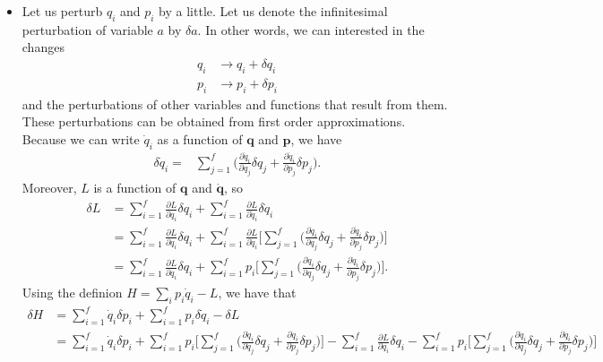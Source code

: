 \documentclass[10pt]{article}
\newcommand{\ve}[1]{\mathbf{#1}}
\begin{document}
\begin{itemize}
    \item Let us perturb $q_i$ and $p_i$ by a little. Let us denote the infinitesimal perturbation of variable $a$ by $\delta a$. In other words, we can interested in the changes
    \begin{align*}
      q_i &\rightarrow q_i + \delta q_i \\
      p_i &\rightarrow p_i + \delta p_i
    \end{align*}
    and the perturbations of other variables and functions that result from them. These perturbations can be obtained from first order approximations. Because we can write $\dot{q}_i$ as a function of $\ve{q}$ and $\ve{p}$, we have
    \begin{align*}
      \delta\dot{q}_i =
      &\sum_{j=1}^f \bigg( \frac{\partial \dot{q}_i}{\partial q_j} \delta q_j + \frac{\partial \dot{q}_i}{\partial p_j} \delta p_j \bigg).
    \end{align*}
    Moreover, $L$ is a function of $\ve{q}$ and $\dot{\ve{q}}$, so
    \begin{align*}
      \delta L 
      &= \sum_{i=1}^f \frac{\partial L}{\partial q_i} \delta q_i + \sum_{i=1}^f \frac{\partial L}{\partial \dot{q}_i} \delta \dot{q}_i \\
      &= \sum_{i=1}^f \frac{\partial L}{\partial q_i} \delta q_i + \sum_{i=1}^f \frac{\partial L}{\partial \dot{q}_i} \bigg[ \sum_{j=1}^f \bigg( \frac{\partial \dot{q}_i}{\partial q_j} \delta q_j + \frac{\partial \dot{q}_i}{\partial p_j} \delta p_j \bigg) \bigg] \\
      &= \sum_{i=1}^f \frac{\partial L}{\partial q_i} \delta q_i + \sum_{i=1}^f p_i \bigg[ \sum_{j=1}^f \bigg( \frac{\partial \dot{q}_i}{\partial q_j} \delta q_j + \frac{\partial \dot{q}_i}{\partial p_j} \delta p_j \bigg) \bigg].
    \end{align*}
    Using the definion $H = \sum_{i} p_i \dot{q}_i - L$, we have that
    \begin{align*}
      \delta H 
      &= \sum_{i=1}^f \dot{q}_i \delta p_i + \sum_{i=1}^f p_i \delta \dot{q}_i - \delta L \\
      &= \sum_{i=1}^f \dot{q}_i \delta p_i 
      + \sum_{i=1}^f p_i \bigg[ \sum_{j=1}^f \bigg( \frac{\partial \dot{q}_i}{\partial q_j} \delta q_j + \frac{\partial \dot{q}_i}{\partial p_j} \delta p_j \bigg)\bigg] 
      - \sum_{i=1}^f \frac{\partial L}{\partial q_i} \delta q_i 
      - \sum_{i=1}^f p_i \bigg[ \sum_{j=1}^f \bigg( \frac{\partial \dot{q}_i}{\partial q_j} \delta q_j + \frac{\partial \dot{q}_i}{\partial p_j} \delta p_j \bigg) \bigg]\\

\end{align*}
\end{itemize}
\end{document}
